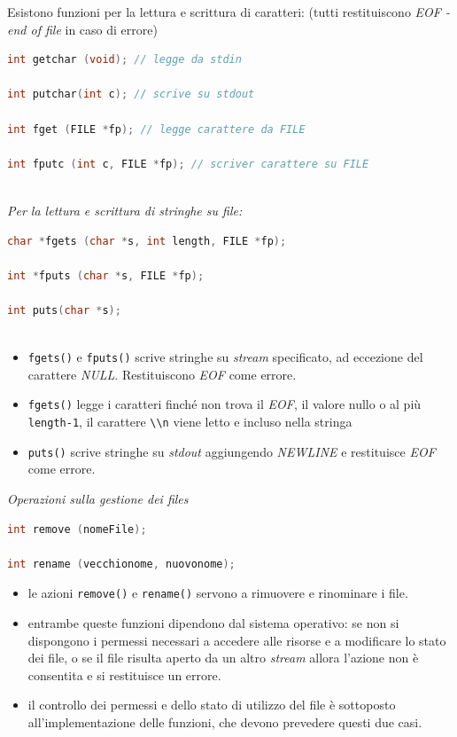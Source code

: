 \documentclass[
  paper=a4,
  oneside  ,captions=tableheading
]{scrbook}
\newcommand{\passthrough}[1]{#1}
\providecommand{\tightlist}{%
  \setlength{\itemsep}{0pt}\setlength{\parskip}{0pt}}
\begin{document}
Esistono funzioni per la lettura e scrittura di caratteri: (tutti
restituiscono \emph{EOF - end of file} in caso di errore)

\begin{lstlisting}[language=C]
int getchar (void); // legge da stdin

int putchar(int c); // scrive su stdout

int fget (FILE *fp); // legge carattere da FILE
  
int fputc (int c, FILE *fp); // scriver carattere su FILE
 
\end{lstlisting}

\emph{Per la lettura e scrittura di stringhe su file:}

\begin{lstlisting}[language=C]
char *fgets (char *s, int length, FILE *fp);

int *fputs (char *s, FILE *fp);

int puts(char *s);
 
\end{lstlisting}

\begin{itemize}
\tightlist
\item
  \passthrough{\lstinline!fgets()!} e \passthrough{\lstinline!fputs()!}
  scrive stringhe su \emph{stream} specificato, ad eccezione del
  carattere \emph{NULL}. Restituiscono \emph{EOF} come errore.
\item
  \passthrough{\lstinline!fgets()!} legge i caratteri finché non trova
  il \emph{EOF}, il valore nullo o al più
  \passthrough{\lstinline!length-1!}, il carattere
  \passthrough{\lstinline!\\n!} viene letto e incluso nella stringa
\item
  \passthrough{\lstinline!puts()!} scrive stringhe su \emph{stdout}
  aggiungendo \emph{NEWLINE} e restituisce \emph{EOF} come errore.
\end{itemize}

\emph{Operazioni sulla gestione dei files}

\begin{lstlisting}[language=C]
int remove (nomeFile);

int rename (vecchionome, nuovonome);
\end{lstlisting}

\begin{itemize}
\tightlist
\item
  le azioni \passthrough{\lstinline!remove()!} e
  \passthrough{\lstinline!rename()!} servono a rimuovere e rinominare i
  file.
\item
  entrambe queste funzioni dipendono dal sistema operativo: se non si
  dispongono i permessi necessari a accedere alle risorse e a modificare
  lo stato dei file, o se il file risulta aperto da un altro
  \emph{stream} allora l'azione non è consentita e si restituisce un
  errore.
\item
  il controllo dei permessi e dello stato di utilizzo del file è
  sottoposto all'implementazione delle funzioni, che devono prevedere
  questi due casi.
\end{itemize}
\end{document}
